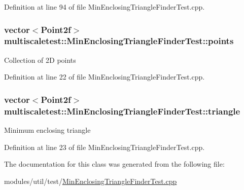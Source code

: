 Definition at line 94 of file Min\-Enclosing\-Triangle\-Finder\-Test.\-cpp.

\hypertarget{classmultiscaletest_1_1MinEnclosingTriangleFinderTest_ace108c67a933a0d79c05b304a9683764}{
\subsubsection[{points}]{\setlength{\rightskip}{0pt plus 5cm}vector$<$Point2f$>$ multiscaletest\-::\-Min\-Enclosing\-Triangle\-Finder\-Test\-::points\hspace{0.3cm}{\ttfamily [protected]}}}\label{classmultiscaletest_1_1MinEnclosingTriangleFinderTest_ace108c67a933a0d79c05b304a9683764}
Collection of 2\-D points 

Definition at line 22 of file Min\-Enclosing\-Triangle\-Finder\-Test.\-cpp.

\hypertarget{classmultiscaletest_1_1MinEnclosingTriangleFinderTest_a02aa9bcd10630d27293e656233e3f64e}{
\subsubsection[{triangle}]{\setlength{\rightskip}{0pt plus 5cm}vector$<$Point2f$>$ multiscaletest\-::\-Min\-Enclosing\-Triangle\-Finder\-Test\-::triangle\hspace{0.3cm}{\ttfamily [protected]}}}\label{classmultiscaletest_1_1MinEnclosingTriangleFinderTest_a02aa9bcd10630d27293e656233e3f64e}
Minimum enclosing triangle 

Definition at line 23 of file Min\-Enclosing\-Triangle\-Finder\-Test.\-cpp.



The documentation for this class was generated from the following file\-:\begin{DoxyCompactItemize}
\item 
modules/util/test/\hyperlink{MinEnclosingTriangleFinderTest_8cpp}{Min\-Enclosing\-Triangle\-Finder\-Test.\-cpp}\end{DoxyCompactItemize}
